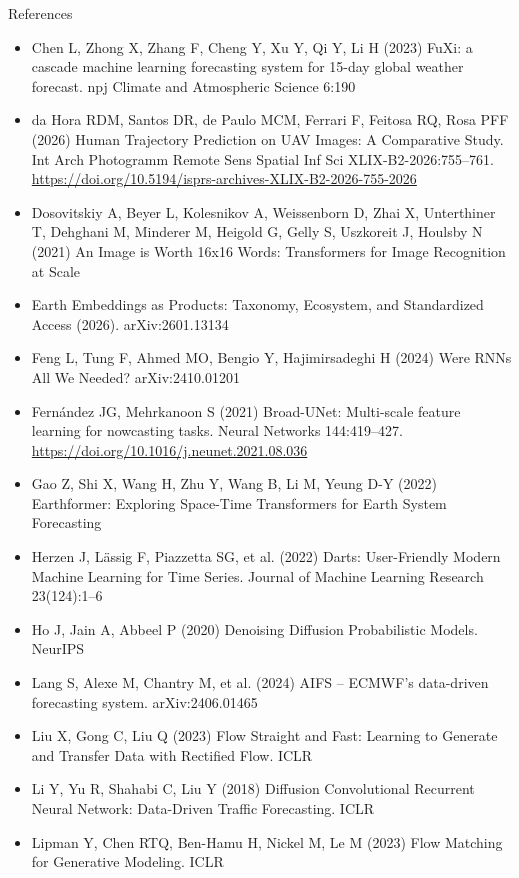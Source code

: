 \documentclass{beamer}
\begin{document}
\begin{frame}[allowframebreaks]{References}
\begin{itemize}
        \item[] Chen L, Zhong X, Zhang F, Cheng Y, Xu Y, Qi Y, Li H (2023) FuXi: a cascade machine learning forecasting system for 15-day global weather forecast. npj Climate and Atmospheric Science 6:190
        \item[] da Hora RDM, Santos DR, de Paulo MCM, Ferrari F, Feitosa RQ, Rosa PFF (2026) Human Trajectory Prediction on UAV Images: A Comparative Study. Int Arch Photogramm Remote Sens Spatial Inf Sci XLIX-B2-2026:755--761. \url{https://doi.org/10.5194/isprs-archives-XLIX-B2-2026-755-2026}
        \item[] Dosovitskiy A, Beyer L, Kolesnikov A, Weissenborn D, Zhai X, Unterthiner T, Dehghani M, Minderer M, Heigold G, Gelly S, Uszkoreit J, Houlsby N (2021) An Image is Worth 16x16 Words: Transformers for Image Recognition at Scale
        \item[] Earth Embeddings as Products: Taxonomy, Ecosystem, and Standardized Access (2026). arXiv:2601.13134
        \item[] Feng L, Tung F, Ahmed MO, Bengio Y, Hajimirsadeghi H (2024) Were RNNs All We Needed? arXiv:2410.01201
        \item[] Fernández JG, Mehrkanoon S (2021) Broad-UNet: Multi-scale feature learning for nowcasting tasks. Neural Networks 144:419--427. \url{https://doi.org/10.1016/j.neunet.2021.08.036}
        \item[] Gao Z, Shi X, Wang H, Zhu Y, Wang B, Li M, Yeung D-Y (2022) Earthformer: Exploring Space-Time Transformers for Earth System Forecasting
        \item[] Herzen J, Lässig F, Piazzetta SG, et al. (2022) Darts: User-Friendly Modern Machine Learning for Time Series. Journal of Machine Learning Research 23(124):1--6
        \item[] Ho J, Jain A, Abbeel P (2020) Denoising Diffusion Probabilistic Models. NeurIPS
        \item[] Lang S, Alexe M, Chantry M, et al. (2024) AIFS -- ECMWF's data-driven forecasting system. arXiv:2406.01465
        \item[] Liu X, Gong C, Liu Q (2023) Flow Straight and Fast: Learning to Generate and Transfer Data with Rectified Flow. ICLR
        \item[] Li Y, Yu R, Shahabi C, Liu Y (2018) Diffusion Convolutional Recurrent Neural Network: Data-Driven Traffic Forecasting. ICLR
        \item[] Lipman Y, Chen RTQ, Ben-Hamu H, Nickel M, Le M (2023) Flow Matching for Generative Modeling. ICLR

\end{itemize}
\end{frame}
\end{document}
